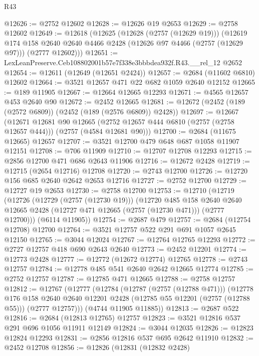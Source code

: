 \begin{lexlean}{R43}
\begin{coremodule}
@12626 := @2752 @12602
@12628 := @12626 @19 @2653
@12629 := @2758 @12602
@12649 := @12618
    (@12625
      (@12628 (@2757 (@12629 @19)))
      (@12619
        @174
        @158
        @2640
        @2640
        @4466
        @2428
        (@12626 @97 @4466 (@2757 (@12629 @97)))
        (@2777 @12602)))
@12651 := LexLeanPreserve.Ceb108802001b57e7f338e3bbbdea932f.R43.__rel_12 @2652
@12654 := @12611 (@12649 (@12651 @2424))
@12657 := @2684 (@11602 @6810) @12602
@12664 := @3521 @12657 @471 @22 @682 @1059 @2640 @12152
@12665 := @189 @11905
@12667 := @12664 @12665 @12293
@12671 := @4565 @12657 @453 @2640 @90
@12672 := @2452 @12665
@12681 := @12672 (@2452 (@189 (@2572 @6809)) (@2452 (@189 (@2576 @6809)) @2428))
@12697 := @12667
    (@12671
      @12681
      @90
      @12665
      (@2752 @12657 @444 @6810 (@2757 (@2758 @12657 @444)))
      (@2757 (@4584 @12681 @90)))
@12700 := @2684 (@11675 @12665) @12657
@12707 := @3521 @12700 @479 @648 @687 @1058 @11907 @12151
@12708 := @706 @11909
@12710 := @12707 @12708 @12293
@12715 := @2856 @12700 @471 @686 @2643 @11906
@12716 := @12672 @2428
@12719 := @12715 (@2654 @12716) @12708
@12720 := @2743 @12700
@12726 := @12720 @156 @685 @2640 @2642 @2653 @12716
@12727 := @2752 @12700
@12729 := @12727 @19 @2653
@12730 := @2758 @12700
@12753 := @12710
    (@12719
      (@12726
        (@12729 (@2757 (@12730 @19)))
        (@12720
          @485
          @158
          @2640
          @2640
          @12665
          @2428
          (@12727 @471 @12665 (@2757 (@12730 @471)))
          (@2777 @12700)))
      (@6114 @11905))
@12754 := @2687 @479
@12757 := @2684 (@12754 @12708) @12700
@12764 := @3521 @12757 @522 @291 @691 @1057 @2645 @12150
@12765 := @3044 @12024
@12767 := @12764 @12765 @12293
@12772 := @2727 @12757 @418 @690 @2643 @2640
@12773 := @2452 @12201
@12774 := @12773 @2428
@12777 := @12772 (@12672 @12774) @12765
@12778 := @2743 @12757
@12784 := @12778 @485 @541 @2640 @2642 @12665 @12774
@12785 := @2752 @12757
@12787 := @12785 @471 @12665
@12788 := @2758 @12757
@12812 := @12767
    (@12777
      (@12784
        (@12787 (@2757 (@12788 @471)))
        (@12778
          @176
          @158
          @2640
          @2640
          @12201
          @2428
          (@12785 @55 @12201 (@2757 (@12788 @55)))
          (@2777 @12757)))
      (@4744 @11905 @11885))
@12813 := @2687 @522
@12816 := @2684 (@12813 @12765) @12757
@12823 := @3521 @12816 @537 @291 @696 @1056 @11911 @12149
@12824 := @3044 @12035
@12826 := @12823 @12824 @12293
@12831 := @2856 @12816 @537 @695 @2642 @11910
@12832 := @2452 @12708
@12856 := @12826
    (@12831
      (@12832 @2428)

\end{coremodule}
\end{lexlean}
